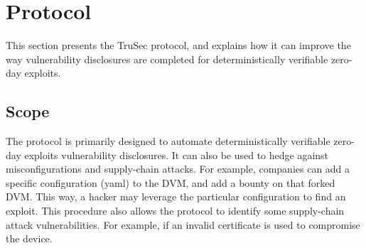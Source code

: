 \section{Protocol}
\label{sec:protocol}
This section presents the TruSec protocol, and explains how it can improve the way vulnerability disclosures are completed for deterministically verifiable zero-day exploits.

\subsection{Scope}\label{subsec:scope}
The protocol is primarily designed to automate deterministically verifiable zero-day exploits vulnerability disclosures. It can also be used to hedge against misconfigurations and supply-chain attacks. For example, companies can add a specific configuration (yaml) to the DVM, and add a bounty on that forked DVM. This way, a hacker may leverage the particular configuration to find an exploit. This procedure also allows the protocol to identify some supply-chain attack vulnerabilities. For example, if an invalid certificate is used to compromise the device.

